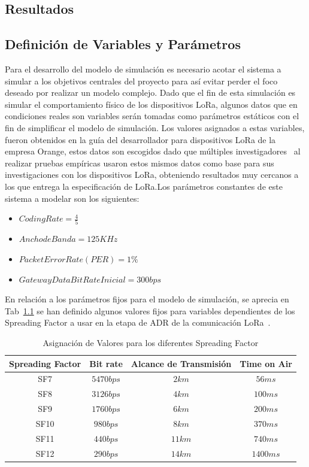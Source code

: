 \begin{justify}
\chapter[Resultados]{Resultados}
\label{ch:resul}
\section{Definición de Variables y Parámetros}
Para el desarrollo del modelo de simulación es necesario acotar el sistema a simular a los objetivos centrales del proyecto para así evitar perder el foco deseado por realizar un modelo complejo. Dado que el fin de esta simulación es simular el comportamiento físico de los dispositivos LoRa, algunos datos que en condiciones reales son variables serán tomadas como parámetros estáticos con el fin de simplificar el modelo de simulación. Los valores asignados a estas variables, fueron obtenidos en la guía del desarrollador para dispositivos LoRa de la empresa Orange, estos datos son escogidos dado que múltiples investigadores~\cite{Juha} al realizar pruebas empíricas usaron estos mismos datos como base para sus investigaciones con los dispositivos LoRa, obteniendo resultados muy cercanos a los que entrega la especificación de LoRa.Los parámetros constantes de este sistema a modelar son los siguientes:
\begin{itemize}
\item $Coding Rate=\frac{4}{5}$
\item $Ancho de Banda=125KHz$
\item $Packet Error Rate (PER)=1\%$
\item $Gateway Data Bit Rate Inicial=300bps$
\end{itemize}
\newpage
\noindent
En relación a los parámetros fijos para el modelo de simulación, se aprecia en Tab~\ref{tab:par} se han definido algunos valores fijos para variables dependientes de los Spreading Factor a usar en la etapa de ADR de la comunicación LoRa~\cite{orange}.
\begin{table}[!ht]
\centering
\begin{tabular}{|c|c|c|c|}
\hline
Spreading Factor & Bit rate & Alcance de Transmisión & Time on Air\\ \hline
SF7 & $5470bps$ & $2km$ & $56ms$ \\ \hline
SF8 & $3126bps$ & $4km$ & $100ms$ \\ \hline
SF9 & $1760bps$ & $6km$ & $200ms$ \\ \hline
SF10 & $980bps$ & $8km$ & $370ms$ \\ \hline
SF11 & $440bps$ & $11km$ & $740ms$ \\ \hline
SF12 & $290bps$ & $14km$ & $1400ms$ \\ 
\hline
\end{tabular}
\caption{Asignación de Valores para los diferentes Spreading Factor}
\label{tab:par}
\end{table}


\end{justify}
